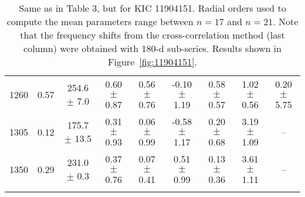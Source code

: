 \documentclass[twocolumn]{aastex61}%
\begin{document}
\begin{table*}[ht]
\begin{tabular}{ccc|ccccc|c}
1260 & 0.57 & 254.6 $\pm$ 7.0 & 0.60 $\pm$ 0.87 & 0.56 $\pm$ 0.76 & -0.10 $\pm$ 1.19 & 0.58 $\pm$ 0.57 & 1.02 $\pm$ 0.56 & 0.20 $\pm$ 5.75\\
1305 & 0.12 & 175.7 $\pm$ 13.5 & 0.31 $\pm$ 0.93 & 0.06 $\pm$ 0.99 & -0.58 $\pm$ 1.17 & 0.20 $\pm$ 0.68 & 3.19 $\pm$ 1.09 & --\\
1350 & 0.29 & 231.0 $\pm$ 0.3 & 0.37 $\pm$ 0.76 & 0.07 $\pm$ 0.41 & 0.51 $\pm$ 0.99 & 0.13 $\pm$ 0.36 & 3.61 $\pm$ 1.11 & --\\\vspace{-0.3cm}
\end{tabular}
\caption{Same as in Table 3, but for KIC 11904151. {Radial orders used to compute the mean parameters range between $n=17$ and $n=21$.} Note that the frequency shifts from the cross-correlation method (last column) were obtained with 180-d sub-series. Results shown in Figure~\ref{fig:11904151}.}\label{tab:11904151}\vspace{-2cm}
\end{table*}
\end{document}
